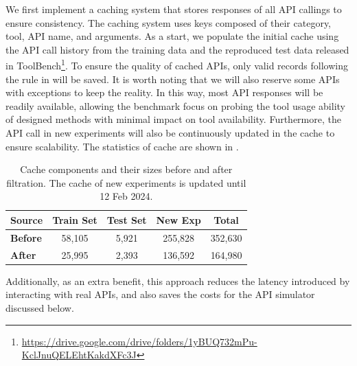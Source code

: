 We first implement a caching system that stores responses of all API callings to ensure consistency.
The caching system uses keys composed of their category, tool, API name, and arguments.
As a start, we populate the initial cache using the API call history from the training data and the reproduced test data released in ToolBench\footnote{\url{https://drive.google.com/drive/folders/1yBUQ732mPu-KclJnuQELEhtKakdXFc3J}}.
To ensure the quality of cached APIs, only valid records following the rule in  will be saved.
It is worth noting that we will also reserve some APIs with exceptions to keep the reality.
In this way, most API responses will be readily available, allowing the benchmark focus on probing the tool usage ability of designed methods with minimal impact on tool availability.
Furthermore, the API call in new experiments will also be continuously updated in the cache to ensure scalability.
The statistics of cache are shown in .
\begin{table}[h!]
    \centering
    \small
    \begin{tabular}{lcccc}
        \toprule
         \textbf{Source} & \textbf{Train Set} & \textbf{Test Set} & \textbf{New Exp} & \textbf{Total} \\
         \midrule
         \textbf{Before} & 58,105 & 5,921 & 255,828 & 352,630 \\
         \textbf{After} & 25,995 & 2,393 & 136,592 & 164,980 \\
         \bottomrule
    \end{tabular}
    \caption{Cache components and their sizes before and after filtration. The cache of new experiments is updated until 12 Feb 2024.}
    \label{tab:cache_components}
\end{table}
Additionally, as an extra benefit, this approach reduces the latency introduced by interacting with real APIs, and also saves the costs for the API simulator discussed below.


